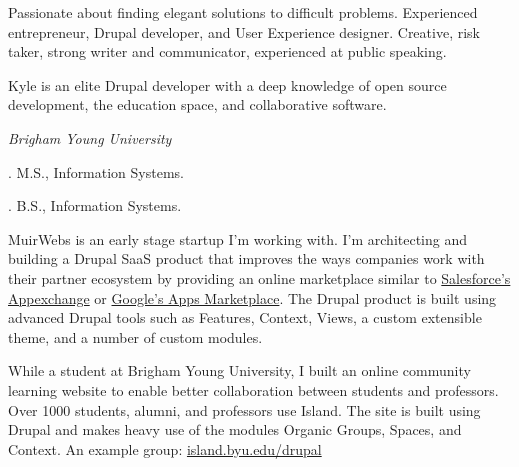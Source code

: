\documentclass[11pt]{article}
\begin{document}
\medskip

\reversemarginpar

\medskip       

\medskip
{}

\noindent Passionate about finding elegant solutions to difficult problems. Experienced entrepreneur, Drupal developer, and User Experience designer. Creative, risk taker, strong writer and communicator, experienced at public speaking.

\medskip

\noindent Kyle is an elite Drupal developer with a deep knowledge of open source development, the education space, and collaborative software.

\bigskip



\noindent\emph{Brigham Young University \vspace{0.15in}}

. M.S., Information Systems.

. B.S., Information Systems.

\bigskip
 
\medskip


\noindent MuirWebs is an early stage startup I'm working with. I'm architecting and building a Drupal SaaS product that improves the ways companies work with their partner ecosystem by providing an online marketplace similar to \href{http://appexchange.salesforce.com/}{Salesforce's Appexchange} or \href{https://www.google.com/enterprise/marketplace/}{Google's Apps Marketplace}. The Drupal product is built using advanced Drupal tools such as Features, Context, Views, a custom extensible theme, and a number of custom modules.

\bigskip


\noindent While a student at Brigham Young University, I built an online community learning website to enable better collaboration between students and professors. Over 1000 students, alumni, and professors use Island. The site is built using Drupal and makes heavy use of the modules Organic Groups, Spaces, and Context. An example group: \href{https://island.byu.edu/drupal}{island.byu.edu/drupal}
\end{document}
